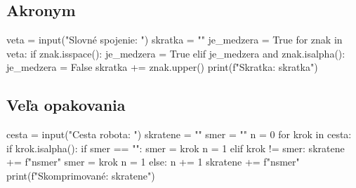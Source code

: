 \subsection{Akronym}
\begin{solution}
veta = input("Slovné spojenie: ")
skratka = ""
je_medzera = True
for znak in veta:
	if znak.isspace():
		je_medzera = True
	elif je_medzera and znak.isalpha():
		je_medzera = False
		skratka += znak.upper()
print(f"Skratka: {skratka}")
\end{solution}


\subsection{Veľa opakovania}
\begin{solution}
cesta = input("Cesta robota: ")
skratene = ""
smer = ""
n = 0
for krok in cesta:
	if krok.isalpha():
		if smer == "":
			smer = krok
			n = 1
		elif krok != smer:
			skratene += f"{n}{smer}"
			smer = krok
			n = 1
		else:
			n += 1
skratene += f"{n}{smer}"
print(f"Skomprimované: {skratene}")
\end{solution}
